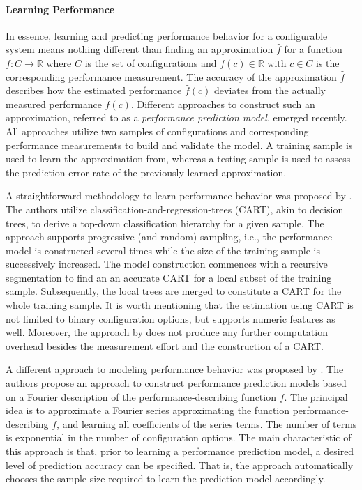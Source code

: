 \paragraph{Learning Performance} In essence, learning and predicting
performance behavior for a configurable system means nothing different than finding an
approximation $\hat{f}$ for a function $f: C \rightarrow \mathbb{R}$ where $C$
is the set of configurations and $f(c) \in \mathbb{R}$ with $c \in C$ is the corresponding performance measurement. The
accuracy of the approximation $\hat{f}$ describes how the estimated performance
$\hat{f}(c)$ deviates from the actually measured performance $f(c)$. 
Different approaches to construct such an approximation, referred to as a
\emph{performance prediction model}, emerged recently. All approaches utilize
two samples of configurations and corresponding performance
measurements to build and validate the model. A training sample is used to
learn the approximation from, whereas a testing sample is used to assess the
prediction error rate of the previously learned approximation. 

A straightforward
methodology to learn performance behavior was proposed by \cite{guo_variability-aware_2013}. The
authors utilize classification-and-regression-trees (CART), akin to decision
trees, to derive a top-down classification hierarchy for a given sample. The
approach supports progressive (and random) sampling, i.e., the performance
model is constructed several times while the size of the training sample is
successively increased. The model construction commences with a recursive
segmentation to find an an accurate CART for a local subset of the training
sample. Subsequently, the local trees are merged to constitute a CART for the
whole training sample. It is worth mentioning that the estimation using CART is
not limited to binary configuration options, but supports numeric features as
well. Moreover, the approach by \cite{guo_variability-aware_2013} does not produce any further
computation overhead besides the measurement effort and the construction of a
CART.

A different approach to modeling performance behavior was
proposed by \cite{zhang_performance_2015}. The authors propose an approach to construct
performance prediction models based on a Fourier description of the
performance-describing function $f$. The principal idea is to approximate a
Fourier series approximating the function performance-describing $f$, and
learning all coefficients of the series terms.
The number of terms is exponential in the number of configuration options. The main
characteristic of this approach is that, prior to learning a performance
prediction model, a desired level of prediction accuracy can be specified. That
is, the approach automatically chooses the sample size required to learn the
prediction model accordingly.

